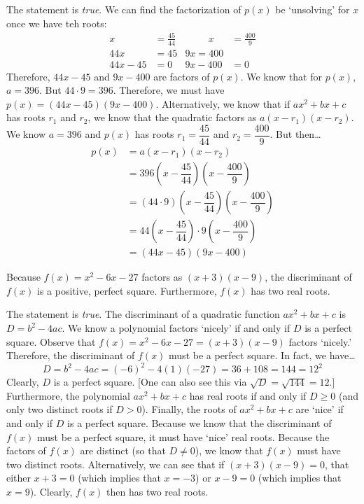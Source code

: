 \documentclass[11pt,letterpaper]{article}
\begin{document}
\sol The statement is \textit{true}. We can find the factorization of $p(x)$ be `unsolving' for $x$ once we have teh roots:
	\[
	\begin{aligned}
	x&= \frac{45}{44} &\hspace{1cm} x&= \frac{400}{9} \\[0.2cm]
	44x&= 45 & 9x= 400 \\[0.2cm]
	44x - 45&= 0 & 9x - 400&= 0
	\end{aligned}
	\]
Therefore, $44x - 45$ and $9x - 400$ are factors of $p(x)$. We know that for $p(x)$, $a= 396$. But $44 \cdot 9= 396$. Therefore, we must have $p(x)= (44x - 45)(9x - 400)$. Alternatively, we know that if $ax^2 + bx + c$ has roots $r_1$ and $r_2$, we know that the quadratic factors as $a(x - r_1)(x - r_2)$. We know $a= 396$ and $p(x)$ has roots $r_1= \dfrac{45}{44}$ and $r_2= \dfrac{400}{9}$. But then\dots
	\[
	\begin{aligned}
	p(x)&= a(x - r_1)(x - r_2) \\
	&= 396 \left(x - \dfrac{45}{44} \right) \left(x - \dfrac{400}{9} \right) \\
	&= (44 \cdot 9) \left(x - \dfrac{45}{44} \right) \left(x - \dfrac{400}{9} \right) \\
	&= 44 \left(x - \dfrac{45}{44} \right) \cdot 9 \left(x - \dfrac{400}{9} \right) \\
	&= (44x - 45)(9x - 400)
	\end{aligned}
	\] \pvspace{1.3cm}



 Because $f(x)= x^2 - 6x - 27$ factors as $(x + 3)(x - 9)$, the discriminant of $f(x)$ is a positive, perfect square. Furthermore, $f(x)$ has two real roots. \pspace

\sol The statement is \textit{true}. The discriminant of a quadratic function $ax^2 + bx + c$ is $D= b^2 - 4ac$. We know a polynomial factors `nicely' if and only if $D$ is a perfect square. Observe that $f(x)= x^2 - 6x - 27= (x + 3)(x- 9)$ factors `nicely.' Therefore, the discriminant of $f(x)$ must be a perfect square. In fact, we have\dots
	\[
	D= b^2 - 4ac= (-6)^2 - 4(1)(-27)= 36 + 108= 144= 12^2
	\]
Clearly, $D$ is a perfect square. [One can also see this via $\sqrt{D}= \sqrt{144}= 12$.] Furthermore, the polynomial $ax^2 + bx + c$ has real roots if and only if $D \geq 0$ (and only two distinct roots if $D > 0$). Finally, the roots of $ax^2 + bx + c$ are `nice' if and only if $D$ is a perfect square. Because we know that the discriminant of $f(x)$ must be a perfect square, it must have `nice' real roots. Because the factors of $f(x)$ are distinct (so that $D \neq 0$), we know that $f(x)$ must have two distinct roots. Alternatively, we can see that if $(x + 3)(x - 9)= 0$, that either $x + 3= 0$ (which implies that $x= -3$) or $x - 9= 0$ (which implies that $x= 9$). Clearly, $f(x)$ then has two real roots. \pvspace{{1cm}}
\end{document}

